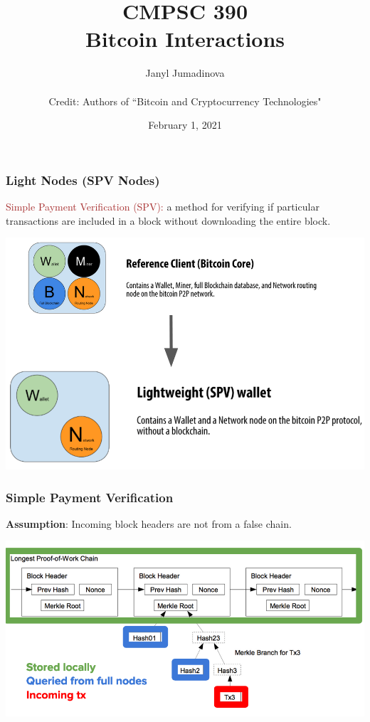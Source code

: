 \documentclass{beamer}
\title{CMPSC 390 \\ Bitcoin Interactions}
\author{Janyl Jumadinova \\ $ $ \\ Credit: Authors of ``Bitcoin and Cryptocurrency Technologies"}
\date{February 1, 2021}
\begin{document}
\begin{frame}
  \titlepage
\end{frame}

\begin{frame}
  \frametitle{Light Nodes (SPV Nodes) }
 	\begin{block}{\textcolor{brown}{Simple Payment Verification (SPV): }}
 	 a method for verifying if particular transactions are included in a block without downloading the entire block.
 	\end{block}
 	\pause
 	\centering
	\includegraphics[scale=0.35]{nodes}
\end{frame}
\begin{frame}
  \frametitle{Simple Payment Verification}
 	\begin{block}{\textbf{Assumption}: }
Incoming block headers are not from a false chain.
 	\end{block}
 	\centering
	\includegraphics[scale=0.5]{transact}
\end{frame}
\end{document}
